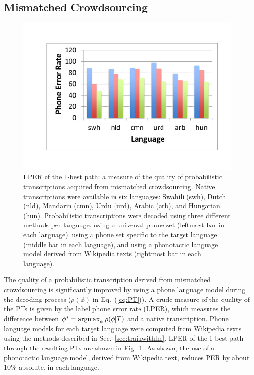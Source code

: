 \subsection{Mismatched Crowdsourcing}
\label{s6:mc}

\begin{figure}
  \centerline{\includegraphics[width=0.7\columnwidth]{../figs/lm_results.pdf}}
  \vspace*{-0.7cm}
  \caption{LPER of the 1-best path: a measure of the quality of
    probabilistic transcriptions acquired from mismatched
    crowdsourcing.  Native transcriptions were available in six
    languages: Swahili (swh), Dutch (nld), Mandarin (cmn), Urdu (urd),
    Arabic (arb), and Hungarian (hun).  Probabilistic transcriptions
    were decoded using three different methods per language: using a
    universal phone set (leftmost bar in each language), using a
    phone set specific to the target language (middle bar in each
    language), and using a phonotactic language model derived from
    Wikipedia texts (rightmost bar in each language).}
  \label{fig:pt_decode_per}
\end{figure}

The quality of a probabilistic transcription derived from mismatched
crowdsourcing is significantly improved by using a phone language
model during the decoding process ($\rho(\phi)$ in Eq.~(\ref{eq:PT})).
A crude measure of the quality of the PTs is given by the label phone error
rate (LPER), which measures the difference
between $\phi^* = \operatorname*{argmax}_{\phi} \rho(\phi|T)$ and a native transcription. Phone
language models for each target language were computed from Wikipedia
texts using the methods described in Sec.~\ref{sec:trainwithlm}.
LPER of the 1-best path through the resulting PTs are shown in
Fig.~\ref{fig:pt_decode_per}.  As shown, the use of a phonotactic
language model, derived from Wikipedia text, reduces PER by about 10\%
absolute, in each language.

